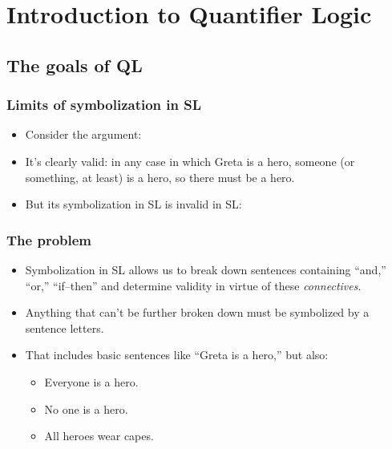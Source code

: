 ﻿%

\setcounter{section}{4}

\section{Introduction to Quantifier Logic}

\subsection{The goals of QL}

\begin{frame}
  \frametitle{Limits of symbolization in SL}

\begin{itemize}[<+->]
  \item Consider the argument:
  \item It's clearly valid: in any case in which Greta is a hero,
  someone (or something, at least) is a hero, so there must be a hero.
  \item But its symbolization in SL is invalid in SL:
\end{itemize}
\end{frame}

\begin{frame}
  \frametitle{The problem}

  \begin{itemize}[<+->]
    \item Symbolization in SL allows us to break down sentences
    containing ``and,'' ``or,'' ``if--then'' and determine validity in
    virtue of these \emph{connectives}.
    \item Anything that can't be further broken down must be
    symbolized by a sentence letters.
    \item That includes basic sentences like ``Greta is a hero,'' but also:
    \begin{itemize}
      \item Everyone is a hero.
      \item No one is a hero.
      \item All heroes wear capes.
    \end{itemize}
  \end{itemize}
\end{frame}

